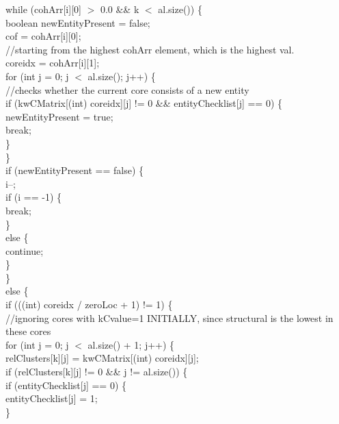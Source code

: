 \begin{ttfamily   }
\begin{scriptsize}
        \noindent while (cohArr[i][0] $>$ 0.0 \&\& k $<$ al.size()) \{\\
            boolean newEntityPresent = false;\\
            cof = cohArr[i][0];\\\noindent//starting from the highest cohArr element, which is the highest val.\\
            coreidx = cohArr[i][1];\\
            \noindent for (int j = 0;   j $<$ al.size();   j++) \{\\\noindent//checks whether the current core consists of a new entity\\
                if (kwCMatrix[(int) coreidx][j] != 0 \&\& entityChecklist[j] == 0) \{\\
                    newEntityPresent = true;\\
                    break;\\
                \}\\
            \}\\
            if (newEntityPresent == false) \{\\
                i--;\\
                if (i == -1) \{\\
                    break;\\
                \}\\ else \{\\
                    continue;\\
                \}\\
            \}\\ else \{\\
                if (((int) coreidx / zeroLoc + 1) != 1) \{\\\noindent//ignoring cores with kCvalue=1 INITIALLY, since structural  is the lowest in these cores\\
                    \noindent for (int j = 0;   j $<$ al.size() + 1;   j++) \{\\
                        relClusters[k][j] = kwCMatrix[(int) coreidx][j];\\
                        if (relClusters[k][j] != 0 \&\& j != al.size()) \{\\
                            if (entityChecklist[j] == 0) \{\\
                                entityChecklist[j] = 1;\\
                            \}\\

\end{scriptsize}
\end{ttfamily   }
